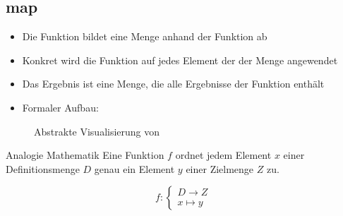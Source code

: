 \documentclass{../tuda-beamer}
\begin{document}
  \subsection{map}
  \begin{frame}{}
    \begin{itemize}
      \item Die Funktion bildet eine Menge anhand der Funktion ab
      \item Konkret wird die Funktion auf jedes Element der der Menge angewendet
      \item Das Ergebnis ist eine Menge, die alle Ergebnisse der Funktion enthält
      \item Formaler Aufbau:
      \begin{center}
      \end{center}
    \end{itemize}
  \end{frame}

  \begin{frame}[c]
    \begin{figure}[h]
      \centering
      \caption{Abstrakte Visualisierung von }
    \end{figure}
  \end{frame}

  \begin{frame}{Analogie Mathematik}
    Eine Funktion \(f\) ordnet jedem Element \(x\) einer Definitionsmenge \(D\) genau ein Element \(y\) einer Zielmenge \(Z\) zu.

    \begin{equation}
      f:
      \begin{cases}
        D \rightarrow Z
        \\
        x \mapsto y
      \end{cases}
    \end{equation}
  \end{frame}
\end{document}
